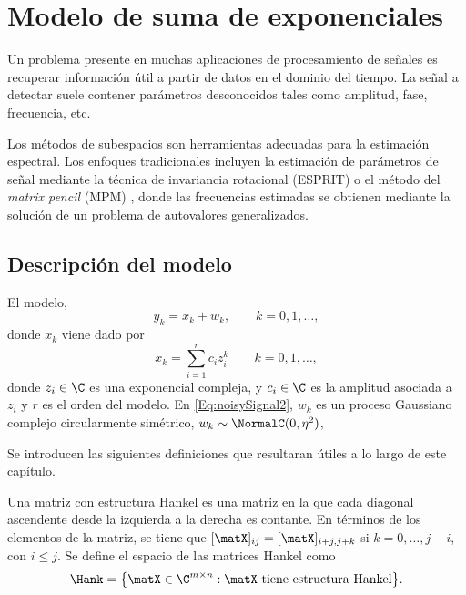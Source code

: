 \chapter{Modelo de suma de exponenciales}\label{chap:ModeloSumExp}

	Un problema presente en muchas aplicaciones de procesamiento de señales es recuperar  información útil  a partir de datos en el dominio del tiempo. La señal a detectar suele contener parámetros desconocidos tales como amplitud, fase, frecuencia, etc. 

	Los métodos de subespacios \cite{Stoica2005} son herramientas adecuadas para la estimación espectral. Los enfoques tradicionales incluyen la estimación de parámetros de señal mediante la técnica de invariancia rotacional (ESPRIT) \cite{Roy1989} o el método del \emph{matrix pencil} (MPM) \cite{Hua1990}, donde las frecuencias estimadas se obtienen mediante la solución de un problema de autovalores generalizados. 


	\section{Descripción del modelo}\label{sec:ModelDescription}

		El modelo,
		\begin{equation}
			y_k = x_k + w_k,\qquad k=0,1,\ldots,
			\label{Eq:noisySignal2}
		\end{equation}
		donde $x_k$ viene dado por
		\begin{equation}
			x_k = \sum_{i=1}^{r}c_iz_i^k  \qquad k = 0,1,\ldots, 
			\label{Eq:Eq:NoiselessSignal}
		\end{equation}
		donde $z_i\in\C$ es una exponencial compleja, y $c_i\in\C$ es la amplitud asociada a $z_i$ y $r$ es el orden del modelo. En \eqref{Eq:noisySignal2}, $w_k$ es un proceso Gaussiano complejo circularmente simétrico, $w_k\sim\NormalC(0,\eta^2)$, 
		
		Se introducen las siguientes definiciones que resultaran útiles a lo largo de este capítulo.
	
	
		\begin{definition}\label{Def:Hankel}
			Una matriz con estructura Hankel es una matriz en la que cada diagonal ascendente desde la izquierda a la derecha es contante. En términos de los elementos de la matriz, se tiene que $[\matX]_{ij} = [\matX]_{i+j,j+k}$ si $k = 0,\ldots,j-i$, con $i\le j$. Se define el espacio de las matrices Hankel como
			\begin{equation}
				\Hank = \big\{\matX\in\C^{m\times n}:\matX \text{ tiene estructura Hankel}\big\}.
				\label{Eq:HankelSet}
			\end{equation}
		\end{definition}
	
